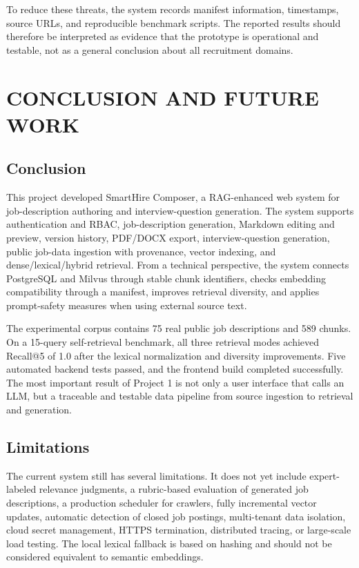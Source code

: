 \documentclass[12pt,a4paper,oneside]{report}
\newcommand{\ProjectName}{SmartHire Composer}
\begin{document}
To reduce these threats, the system records manifest information, timestamps, source URLs, and reproducible benchmark scripts. The reported results should therefore be interpreted as evidence that the prototype is operational and testable, not as a general conclusion about all recruitment domains.

\chapter{CONCLUSION AND FUTURE WORK}

\section{Conclusion}
This project developed \ProjectName, a RAG-enhanced web system for job-description authoring and interview-question generation. The system supports authentication and RBAC, job-description generation, Markdown editing and preview, version history, PDF/DOCX export, interview-question generation, public job-data ingestion with provenance, vector indexing, and dense/lexical/hybrid retrieval. From a technical perspective, the system connects PostgreSQL and Milvus through stable chunk identifiers, checks embedding compatibility through a manifest, improves retrieval diversity, and applies prompt-safety measures when using external source text.

The experimental corpus contains 75 real public job descriptions and 589 chunks. On a 15-query self-retrieval benchmark, all three retrieval modes achieved Recall@5 of 1.0 after the lexical normalization and diversity improvements. Five automated backend tests passed, and the frontend build completed successfully. The most important result of Project 1 is not only a user interface that calls an LLM, but a traceable and testable data pipeline from source ingestion to retrieval and generation.

\section{Limitations}
The current system still has several limitations. It does not yet include expert-labeled relevance judgments, a rubric-based evaluation of generated job descriptions, a production scheduler for crawlers, fully incremental vector updates, automatic detection of closed job postings, multi-tenant data isolation, cloud secret management, HTTPS termination, distributed tracing, or large-scale load testing. The local lexical fallback is based on hashing and should not be considered equivalent to semantic embeddings.
\end{document}
